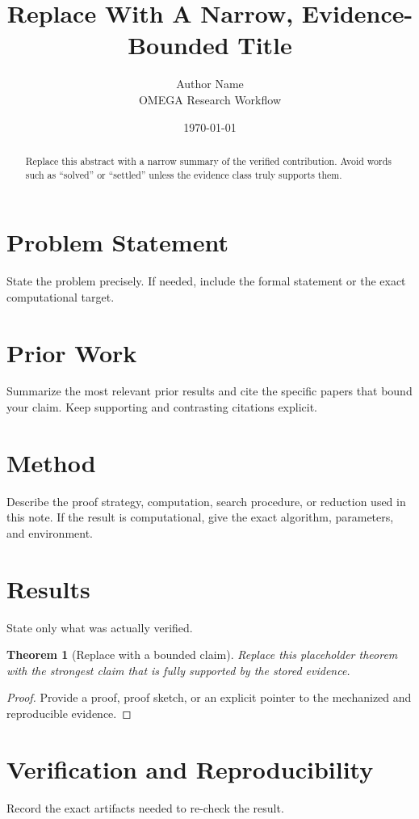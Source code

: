 \documentclass[11pt]{article}
\title{Replace With A Narrow, Evidence-Bounded Title}
\author{Author Name \\ \small OMEGA Research Workflow}
\date{\today}
\newtheorem{theorem}{Theorem}
\begin{document}
\maketitle

\begin{abstract}
Replace this abstract with a narrow summary of the verified contribution.
Avoid words such as ``solved'' or ``settled'' unless the evidence class truly supports them.
\end{abstract}

\section{Problem Statement}
State the problem precisely.
If needed, include the formal statement or the exact computational target.

\section{Prior Work}
Summarize the most relevant prior results and cite the specific papers that bound your claim.
Keep supporting and contrasting citations explicit.

\section{Method}
Describe the proof strategy, computation, search procedure, or reduction used in this note.
If the result is computational, give the exact algorithm, parameters, and environment.

\section{Results}
State only what was actually verified.

\begin{theorem}[Replace with a bounded claim]
Replace this placeholder theorem with the strongest claim that is fully supported by the stored evidence.
\end{theorem}

\begin{proof}
Provide a proof, proof sketch, or an explicit pointer to the mechanized and reproducible evidence.
\end{proof}

\section{Verification and Reproducibility}
Record the exact artifacts needed to re-check the result.
\end{document}
